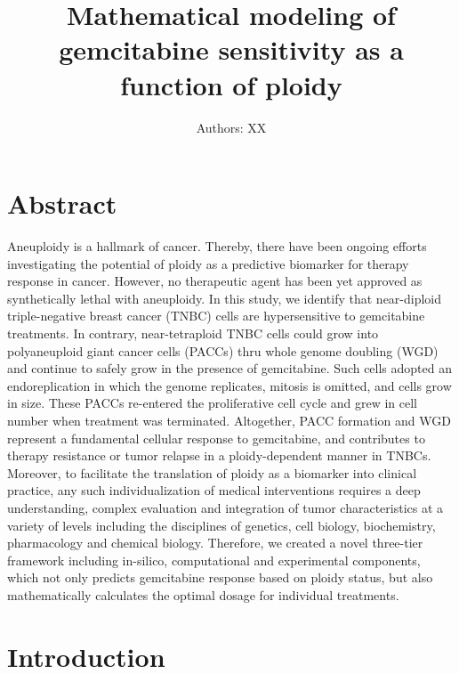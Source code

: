 \documentclass[11pt,notitlepage]{article}
\title{Mathematical modeling of gemcitabine sensitivity as a function of ploidy}
\author{Authors: XX}
\begin{document}
\maketitle

\section*{Abstract}
Aneuploidy is a hallmark of cancer. Thereby, there have been ongoing efforts investigating the potential of ploidy as a predictive biomarker for therapy response in cancer. However, no therapeutic agent has been yet approved as synthetically lethal with aneuploidy. In this study, we identify that near-diploid triple-negative breast cancer (TNBC) cells are hypersensitive to gemcitabine treatments. In contrary, near-tetraploid TNBC cells could grow into polyaneuploid giant cancer cells (PACCs) thru whole genome doubling (WGD) and continue to safely grow in the presence of gemcitabine. Such cells adopted an endoreplication in which the genome replicates, mitosis is omitted, and cells grow in size. These PACCs re-entered the proliferative cell cycle and grew in cell number when treatment was terminated. Altogether, PACC formation and WGD represent a fundamental cellular response to gemcitabine, and contributes to therapy resistance or tumor relapse in a ploidy-dependent manner in TNBCs. Moreover, to facilitate the translation of ploidy as a biomarker into clinical practice, any such individualization of medical interventions requires a deep understanding, complex evaluation and integration of tumor characteristics at a variety of levels including the disciplines of genetics, cell biology, biochemistry, pharmacology and chemical biology. Therefore, we created a novel three-tier framework including in-silico, computational and experimental components, which not only predicts gemcitabine response based on ploidy status, but also mathematically calculates the optimal dosage for individual treatments.
\section*{Introduction}
\end{document}
